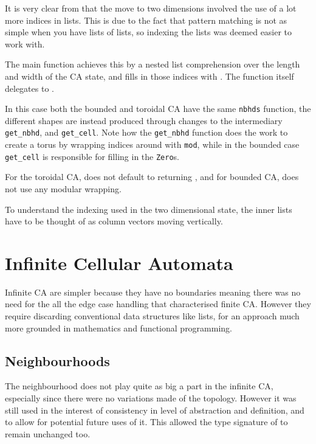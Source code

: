 It is very clear from  that the move to two dimensions involved the use of a lot more indices in lists.
This is due to the fact that pattern matching is not as simple when you have lists of lists,
so indexing the lists was deemed easier to work with.

The main  function achieves this by a nested list comprehension over the length and width of the CA state,
and fills in those indices with .
The function  itself delegates to .

In this case both the bounded and toroidal CA have the same \texttt{nbhds} function,
the different shapes are instead produced through changes to the intermediary \texttt{get_nbhd}, 
and \texttt{get_cell}.
Note how the \texttt{get_nbhd} function does the work to create a torus by wrapping indices around with \texttt{mod},
while in the bounded case \texttt{get_cell} is responsible for filling in the \texttt{Zero}s.

For the toroidal CA,  does not default to returning ,
and for bounded CA,
 does not use any modular wrapping.

To understand the indexing used in the two dimensional state,
the inner lists have to be thought of as column vectors moving vertically. %


\section{Infinite Cellular Automata}

Infinite CA are simpler because they have no boundaries meaning there was no need for the all the edge case handling that characterised finite CA.
However they require discarding conventional data structures like lists,
for an approach much more grounded in mathematics and functional programming.


\subsection{Neighbourhoods}

The neighbourhood does not play quite as big a part in the infinite CA,
especially since there were no variations made of the topology.
However it was still used in the interest of consistency in level of abstraction and definition,
and to allow for potential future uses of it.
This allowed the type signature of  to remain unchanged too.


